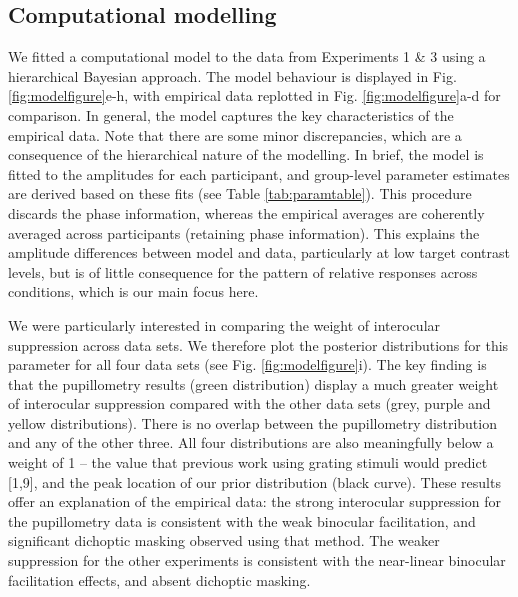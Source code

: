 \documentclass[
]{article}
\begin{document}
\hypertarget{computational-modelling}{%
\subsection{Computational modelling}\label{computational-modelling}}

We fitted a computational model to the data from Experiments 1 \& 3 using a hierarchical Bayesian approach. The model behaviour is displayed in Fig. \ref{fig:modelfigure}e-h, with empirical data replotted in Fig. \ref{fig:modelfigure}a-d for comparison. In general, the model captures the key characteristics of the empirical data. Note that there are some minor discrepancies, which are a consequence of the hierarchical nature of the modelling. In brief, the model is fitted to the amplitudes for each participant, and group-level parameter estimates are derived based on these fits (see Table \ref{tab:paramtable}). This procedure discards the phase information, whereas the empirical averages are coherently averaged across participants (retaining phase information). This explains the amplitude differences between model and data, particularly at low target contrast levels, but is of little consequence for the pattern of relative responses across conditions, which is our main focus here.

We were particularly interested in comparing the weight of interocular suppression across data sets. We therefore plot the posterior distributions for this parameter for all four data sets (see Fig. \ref{fig:modelfigure}i). The key finding is that the pupillometry results (green distribution) display a much greater weight of interocular suppression compared with the other data sets (grey, purple and yellow distributions). There is no overlap between the pupillometry distribution and any of the other three. All four distributions are also meaningfully below a weight of 1 -- the value that previous work using grating stimuli would predict {[}1,9{]}, and the peak location of our prior distribution (black curve). These results offer an explanation of the empirical data: the strong interocular suppression for the pupillometry data is consistent with the weak binocular facilitation, and significant dichoptic masking observed using that method. The weaker suppression for the other experiments is consistent with the near-linear binocular facilitation effects, and absent dichoptic masking.
\end{document}
